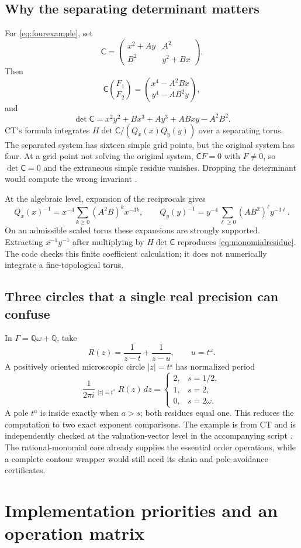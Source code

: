 \documentclass[11pt,letterpaper]{article}
\theoremstyle{definition}\newtheorem{definition}[theorem]{Definition}
\theoremstyle{remark}\newtheorem{remark}[theorem]{Remark}
\newcommand{\Q}{\mathbb Q}\newcommand{\N}{\mathbb N}\newcommand{\Z}{\mathbb Z}
\newcommand{\HInt}{\mathop{\int^{\!H}}\nolimits}
\numberwithin{equation}{section}\setcounter{tocdepth}{2}
\begin{document}
\subsection{Why the separating determinant matters}
For \eqref{eq:fourexample}, set
\[
 \mathsf C=\begin{pmatrix}x^2+Ay&A^2\\B^2&y^2+Bx\end{pmatrix}.
\]
Then
\[
 \mathsf C\binom{F_1}{F_2}
 =\binom{x^4-A^2Bx}{y^4-AB^2y},
\]
and
\[
 \det\mathsf C=x^2y^2+Bx^3+Ay^3+ABxy-A^2B^2.
\]
CT's formula integrates $H\det\mathsf C/(Q_x(x)Q_y(y))$ over a separating torus. The separated system has sixteen simple grid points, but the original system has four. At a grid point not solving the original system, $\mathsf C F=0$ with $F\ne0$, so $\det\mathsf C=0$ and the extraneous simple residue vanishes. Dropping the determinant would compute the wrong invariant \cite{CT}.

At the algebraic level, expansion of the reciprocals gives
\[
 Q_x(x)^{-1}=x^{-4}\sum_{k\ge0}(A^2B)^kx^{-3k},\qquad
 Q_y(y)^{-1}=y^{-4}\sum_{\ell\ge0}(AB^2)^\ell y^{-3\ell}.
\]
On an admissible scaled torus these expansions are strongly supported. Extracting $x^{-1}y^{-1}$ after multiplying by $H\det\mathsf C$ reproduces \eqref{eq:monomialresidue}. The code checks this finite coefficient calculation; it does not numerically integrate a fine-topological torus.

\subsection{Three circles that a single real precision can confuse}
In $\Gamma=\Q\omega+\Q$, take
\[
 R(z)=\frac1{z-t}+\frac1{z-u},\qquad u=t^\omega.
\]
A positively oriented microscopic circle $|z|=t^s$ has normalized period
\[
 \frac1{2\pi i}\HInt_{|z|=t^s}R(z)\,dz
 =\begin{cases}2,&s=1/2,\\1,&s=2,\\0,&s=2\omega.\end{cases}
\]
A pole $t^a$ is inside exactly when $a>s$; both residues equal one. This reduces the computation to two exact exponent comparisons. The example is from CT and is independently checked at the valuation-vector level in the accompanying script \cite{CT}. The rational-monomial core already supplies the essential order operations, while a complete contour wrapper would still need its chain and pole-avoidance certificates.

\section{Implementation priorities and an operation matrix}\label{sec:roadmap}
\end{document}
